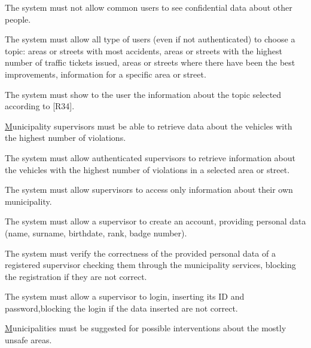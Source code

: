 \documentclass[a4paper]{report}
\begin{document}
\begin{enumerate}[start=1,label={[G\arabic*]}]
\begin{enumerate}[start=31,label={[R\arabic*]}]
\item \label{R33}The system must not allow common users to see confidential data about other people.
\item \label{R34}The system must allow all type of users (even if not authenticated) to choose a topic: areas or streets with most accidents, areas or streets with the highest number of traffic tickets issued, areas or streets where there have been the best improvements, information for a specific area or street.
\item \label{R35}The system must show to the user the information about the topic selected according to [R34].
\end{enumerate}
\item  \hyperref[G5] Municipality supervisors must be able to retrieve data about the vehicles with the highest number of violations.
\begin{enumerate}[start=36,label={[R\arabic*]}]
\item \label{R36}The system must allow authenticated supervisors to retrieve information about the vehicles with the highest number of violations in a selected area or street.
\item \label{R37}The system must allow supervisors to access only information about their own municipality.
\item \label{R38}The system must allow a supervisor to create an account, providing personal data (name, surname, birthdate, rank, badge number).
\end{enumerate}
\begin{enumerate}[start=38,label={[R\arabic*b]}]
\item \label{R38b}The system must verify the correctness of the provided personal data of a registered supervisor checking them through the municipality services, blocking the registration if they are not correct.
\end{enumerate}
\begin{enumerate}[start=39,label={[R\arabic*]}]
\item \label{R39}The system must allow a supervisor to login, inserting its ID and password,blocking the login if the data inserted are not correct.
\end{enumerate}
\item  \hyperref[G6] Municipalities must be suggested for possible interventions about the mostly unsafe areas.

\end{enumerate}
\end{document}
